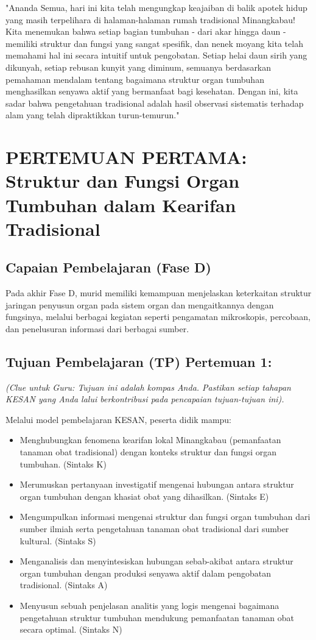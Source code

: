 \documentclass[a4paper,12pt]{article}
\begin{document}
\begin{tcolorbox}[sectionbox]
"Ananda Semua, hari ini kita telah mengungkap keajaiban di balik apotek hidup yang masih terpelihara di halaman-halaman rumah tradisional Minangkabau! Kita menemukan bahwa setiap bagian tumbuhan - dari akar hingga daun - memiliki struktur dan fungsi yang sangat spesifik, dan nenek moyang kita telah memahami hal ini secara intuitif untuk pengobatan. Setiap helai daun sirih yang dikunyah, setiap rebusan kunyit yang diminum, semuanya berdasarkan pemahaman mendalam tentang bagaimana struktur organ tumbuhan menghasilkan senyawa aktif yang bermanfaat bagi kesehatan. Dengan ini, kita sadar bahwa pengetahuan tradisional adalah hasil observasi sistematis terhadap alam yang telah dipraktikkan turun-temurun."
\end{tcolorbox}

\section{PERTEMUAN PERTAMA: Struktur dan Fungsi Organ Tumbuhan dalam Kearifan Tradisional}

\subsection{Capaian Pembelajaran (Fase D)}
Pada akhir Fase D, murid memiliki kemampuan menjelaskan keterkaitan struktur jaringan penyusun organ pada sistem organ dan mengaitkannya dengan fungsinya, melalui berbagai kegiatan seperti pengamatan mikroskopis, percobaan, dan penelusuran informasi dari berbagai sumber.

\subsection{Tujuan Pembelajaran (TP) Pertemuan 1:}
\textit{(Clue untuk Guru: Tujuan ini adalah kompas Anda. Pastikan setiap tahapan KESAN yang Anda lalui berkontribusi pada pencapaian tujuan-tujuan ini).}

Melalui model pembelajaran KESAN, peserta didik mampu:
\begin{itemize}
\item Menghubungkan fenomena kearifan lokal Minangkabau (pemanfaatan tanaman obat tradisional) dengan konteks struktur dan fungsi organ tumbuhan. (Sintaks K)
\item Merumuskan pertanyaan investigatif mengenai hubungan antara struktur organ tumbuhan dengan khasiat obat yang dihasilkan. (Sintaks E)
\item Mengumpulkan informasi mengenai struktur dan fungsi organ tumbuhan dari sumber ilmiah serta pengetahuan tanaman obat tradisional dari sumber kultural. (Sintaks S)
\item Menganalisis dan menyintesiskan hubungan sebab-akibat antara struktur organ tumbuhan dengan produksi senyawa aktif dalam pengobatan tradisional. (Sintaks A)
\item Menyusun sebuah penjelasan analitis yang logis mengenai bagaimana pengetahuan struktur tumbuhan mendukung pemanfaatan tanaman obat secara optimal. (Sintaks N)
\end{itemize}
\end{document}
